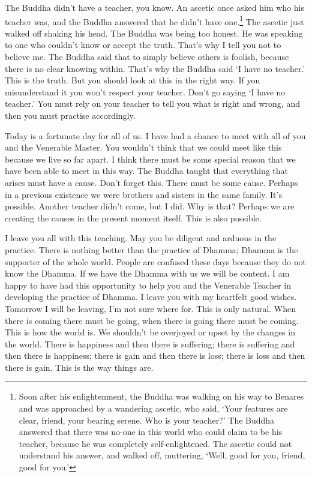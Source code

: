The Buddha didn't have a teacher, you know. An ascetic once asked him who his teacher was, and the Buddha answered that he didn't have one.\footnote{Soon after his enlightenment, the Buddha was walking on his way to Benares and was approached by a wandering ascetic, who said, `Your features are clear, friend, your bearing serene. Who is your teacher?' The Buddha answered that there was no-one in this world who could claim to be his teacher, because he was completely self-enlightened. The ascetic could not understand his answer, and walked off, muttering, `Well, good for you, friend, good for you.'} The ascetic just walked off shaking his head. The Buddha was being too honest. He was speaking to one who couldn't know or accept the truth. That's why I tell you not to believe me. The Buddha said that to simply believe others is foolish, because there is no clear knowing within. That's why the Buddha said `I have no teacher.' This is the truth. But you should look at this in the right way. If you misunderstand it you won't respect your teacher. Don't go saying `I have no teacher.' You must rely on your teacher to tell you what is right and wrong, and then you must practise accordingly.

Today is a fortunate day for all of us. I have had a chance to meet with all of you and the Venerable Master. You wouldn't think that we could meet like this because we live so far apart. I think there must be some special reason that we have been able to meet in this way. The Buddha taught that everything that arises must have a cause. Don't forget this. There must be some cause. Perhaps in a previous existence we were brothers and sisters in the same family. It's possible. Another teacher didn't come, but I did. Why is that? Perhaps we are creating the causes in the present moment itself. This is also possible.

I leave you all with this teaching. May you be diligent and arduous in the practice. There is nothing better than the practice of Dhamma; Dhamma is the supporter of the whole world. People are confused these days because they do not know the Dhamma. If we have the Dhamma with us we will be content. I am happy to have had this opportunity to help you and the Venerable Teacher in developing the practice of Dhamma. I leave you with my heartfelt good wishes. Tomorrow I will be leaving, I'm not sure where for. This is only natural. When there is coming there must be going, when there is going there must be coming. This is how the world is. We shouldn't be overjoyed or upset by the changes in the world. There is happiness and then there is suffering; there is suffering and then there is happiness; there is gain and then there is loss; there is loss and then there is gain. This is the way things are.

